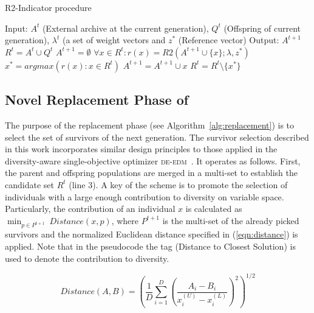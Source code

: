 \begin{algorithm}[!t]
        \caption{R2-Indicator procedure}
        \begin{small}
\begin{algorithmic}[1]
	\STATE Input: $A^t$ (External archive at the current generation), $Q^t$ (Offspring of current generation), $\lambda^t$ (a set of weight vectors and $z^*$ (Reference vector)
	\STATE Output: $A^{t+1}$
	\STATE $R^t= A^t \cup Q^t$
	\STATE $A^{t+1} = \emptyset$
	\STATE $\forall x \in R^t : r(x) = R2(A^{t+1} \cup \{x\}; \lambda, z^*)$
	\STATE $x^* = argmax(r(x):x \in R^t)$ 
	\STATE $A^{t+1} = A^{t+1} \cup x$
	\STATE $R^t = R^t \setminus \{ x^* \}$ 
  	\ENDWHILE
        \end{algorithmic}
        \end{small}
\label{alg:r2_Indicator}
\end{algorithm}



%
\subsection{Novel Replacement Phase of \AVSDMOEAD{} }

The purpose of the replacement phase (see Algorithm~\ref{alg:replacement}) is to select the set of survivors of the next generation.
%
The survivor selection described in this work incorporates similar design principles to those applied in 
the diversity-aware single-objective optimizer \textsc{de-edm}~\cite{castillo2019differential}.
%
It operates as follows.
%
First, the parent and offspring populations are merged in a multi-set to establish the candidate set $R^t$ (line 3).
%
A key of the scheme is to promote the selection of individuals with a large enough contribution to diversity
on variable space.
%
Particularly, the contribution of an individual $x$ is calculated as $\displaystyle{\min_{p \in P^{t+1}}\ Distance(x, p)}$, 
where $P^{t+1}$ is the multi-set of the already picked survivors and the normalized Euclidean distance
specified in (\ref{eqn:distance}) is applied.
%
Note that in the pseudocode the tag \DCS{} (Distance to Closest Solution) is used to denote the contribution to diversity.

\begin{equation}\label{eqn:distance}
Distance(A, B) =   \left ( \frac{1}{D}  \sum_{i=1}^D \left ( \frac{A_i - B_i}{x_i^{(U)} - x_i^{(L)}} \right )^2  \right)^{1/2}
\end{equation}

